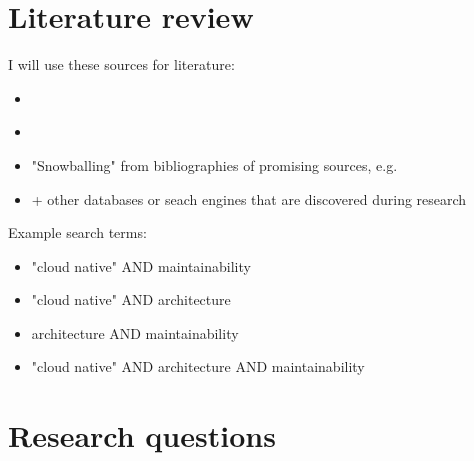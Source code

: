 \documentclass[utf8,english]{gradu3}
\begin{document}


\chapter{Literature review}
I will use these sources for literature:
\begin{itemize}
  \item \textcite{jykdok}
  \item \textcite{google-scholar}
  \item "Snowballing" from bibliographies of promising sources, e.g. \textcite{thesis-time-tracking}
  \item + other databases or seach engines that are discovered during research
\end{itemize}

Example search terms:
\begin{itemize}
  \item "cloud native" AND maintainability
  \item "cloud native" AND architecture
  \item architecture AND maintainability
  \item "cloud native" AND architecture AND maintainability
\end{itemize}


\chapter{Research questions}
\end{document}
